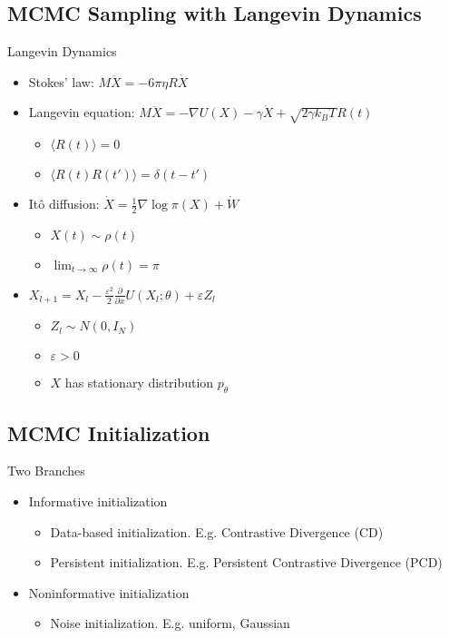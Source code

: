 \documentclass{beamer}
\begin{document}
\subsection{MCMC Sampling with Langevin Dynamics}
\begin{frame}{Langevin Dynamics}
\begin{itemize}
\item Stokes' law: $M{\ddot {X}}=-6\pi\eta R\dot{X}$
\item Langevin equation: $M{\ddot {X}}=-\nabla U(X)-\gamma {\dot {X}}+{\sqrt {2\gamma k_{B}T}}R(t)$
\begin{itemize}
\item $\langle R(t)\rangle=0$
\item $\langle R(t)R(t')\rangle=\delta(t-t')$
\end{itemize}
\item Itô diffusion: $\dot X=\frac{1}{2}\nabla\log\pi(X)+\dot W$
\begin{itemize}
\item $X(t)\sim\rho(t)$
\item $\lim_{t\to\infty}\rho(t)=\pi$
\end{itemize}
\item $X_{l+1}=X_l-\frac{\varepsilon^2}{2}\frac{\partial}{\partial x}U(X_l;\theta)+\varepsilon Z_l$
\begin{itemize}
\item $Z_l\sim N(0,I_N)$
\item $\varepsilon>0$
\item $X$ has stationary distribution $p_\theta$
\end{itemize}
\end{itemize}
\end{frame}

\subsection{MCMC Initialization}
\begin{frame}{Two Branches}
\begin{itemize}
\item Informative initialization
\begin{itemize}
\item Data-based initialization. E.g. Contrastive Divergence (CD)
\item Persistent initialization. E.g. Persistent Contrastive Divergence (PCD)
\end{itemize}
\item Noninformative initialization
\begin{itemize}
\item Noise initialization. E.g. uniform, Gaussian
\end{itemize}
\end{itemize}
\end{frame}
\end{document}
